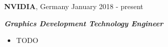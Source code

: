 \textbf{NVIDIA}, Germany  \hfill January 2018 - present

\textbf{\textit{Graphics Development Technology Engineer}}
\begin{itemize}
    \item TODO
\end{itemize}
